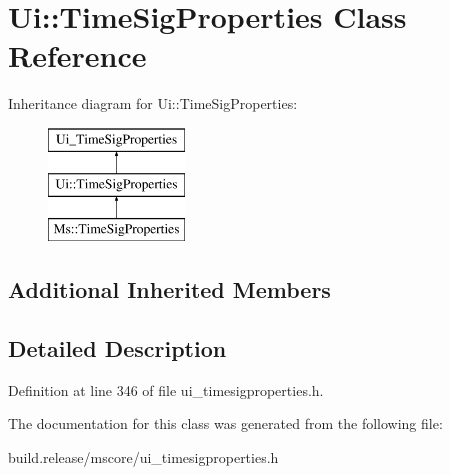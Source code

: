 \hypertarget{class_ui_1_1_time_sig_properties}{}\section{Ui\+:\+:Time\+Sig\+Properties Class Reference}
\label{class_ui_1_1_time_sig_properties}
Inheritance diagram for Ui\+:\+:Time\+Sig\+Properties\+:\begin{figure}[H]
\begin{center}
\leavevmode
\includegraphics[height=3.000000cm]{class_ui_1_1_time_sig_properties}
\end{center}
\end{figure}
\subsection*{Additional Inherited Members}


\subsection{Detailed Description}


Definition at line 346 of file ui\+\_\+timesigproperties.\+h.



The documentation for this class was generated from the following file\+:\begin{DoxyCompactItemize}
\item 
build.\+release/mscore/ui\+\_\+timesigproperties.\+h\end{DoxyCompactItemize}
